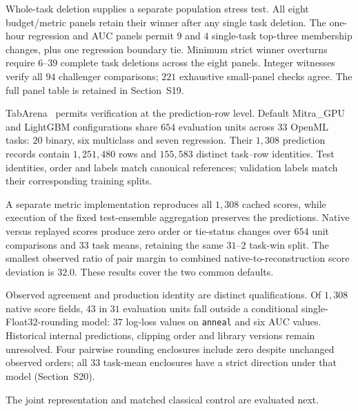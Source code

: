 Whole-task deletion supplies a separate population stress test. All eight budget/metric panels retain their winner after any single task deletion. The one-hour regression and AUC panels permit $9$ and $4$ single-task top-three membership changes, plus one regression boundary tie. Minimum strict winner overturns require $6$--$39$ complete task deletions across the eight panels. Integer witnesses verify all $94$ challenger comparisons; $221$ exhaustive small-panel checks agree. The full panel table is retained in Section~S19.

TabArena~\cite{erickson2025tabarena} permits verification at the prediction-row level. Default Mitra\_GPU and LightGBM configurations share $654$ evaluation units across $33$ OpenML tasks: $20$ binary, six multiclass and seven regression. Their $1{,}308$ prediction records contain $1{,}251{,}480$ rows and $155{,}583$ distinct task--row identities. Test identities, order and labels match canonical references; validation labels match their corresponding training splits.

A separate metric implementation reproduces all $1{,}308$ cached scores, while execution of the fixed test-ensemble aggregation preserves the predictions. Native versus replayed scores produce zero order or tie-status changes over $654$ unit comparisons and $33$ task means, retaining the same $31$--$2$ task-win split. The smallest observed ratio of pair margin to combined native-to-reconstruction score deviation is $32.0$. These results cover the two common defaults.

Observed agreement and production identity are distinct qualifications. Of $1{,}308$ native score fields, $43$ in $31$ evaluation units fall outside a conditional single-Float32-rounding model: $37$ log-loss values on \texttt{anneal} and six AUC values. Historical internal predictions, clipping order and library versions remain unresolved. Four pairwise rounding enclosures include zero despite unchanged observed orders; all $33$ task-mean enclosures have a strict direction under that model (Section~S20).



The joint representation and matched classical control are evaluated next.
